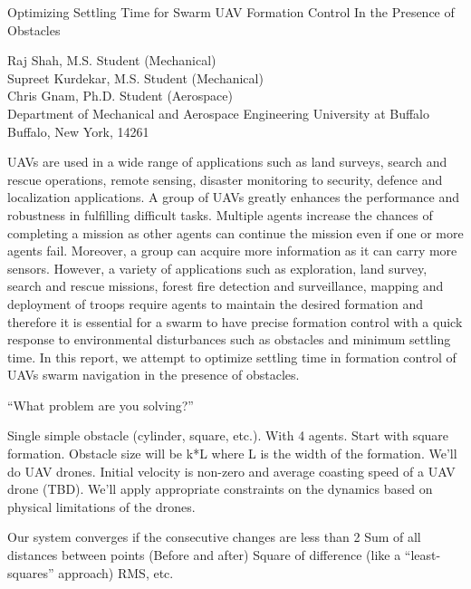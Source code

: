 \documentclass[11pt]{article}
\begin{document}
\begin{center}
{\footnotesize{\hvb
Optimizing Settling Time for Swarm UAV Formation Control In the Presence of Obstacles\\
}}

\vspace{10pt}
{\footnotesize
{\hvb Raj Shah}, {\hv M.S. Student (Mechanical)} \\
{\hvb Supreet Kurdekar}, {\hv M.S. Student (Mechanical)}\\
{\hvb Chris Gnam}, {\hv Ph.D. Student (Aerospace)} \\
{\hv
Department of Mechanical and Aerospace Engineering
University at Buffalo
Buffalo, New York, 14261
}}
\end{center}

UAVs are used in a wide range of applications such as land surveys, search and rescue operations, remote sensing, disaster monitoring to security, defence and localization applications. A group of UAVs greatly enhances the performance and robustness in fulfilling difficult tasks. Multiple agents increase the chances of completing a mission as other agents can continue the mission even if one or more agents fail. Moreover, a group can acquire more information as it can carry more sensors. However, a variety of applications such as exploration, land survey, search and rescue missions, forest fire detection and surveillance, mapping and deployment of troops require agents to maintain the desired formation and therefore it is essential for a swarm to have precise formation control with a quick response to environmental disturbances such as obstacles and minimum settling time. In this report, we attempt to optimize settling time in formation control of UAVs swarm navigation in the presence of obstacles.

“What problem are you solving?”

Single simple obstacle (cylinder, square, etc.).  With 4 agents.  Start with square formation.  Obstacle size will be k*L where L is the width of the formation.  We’ll do UAV drones.  Initial velocity is non-zero and average coasting speed of a UAV drone (TBD).  We’ll apply appropriate constraints on the dynamics based on physical limitations of the drones.

Our system converges if the consecutive changes are less than 2%
Sum of all distances between points (Before and after)
Square of difference (like a “least-squares” approach)
RMS, etc.
\end{document}
